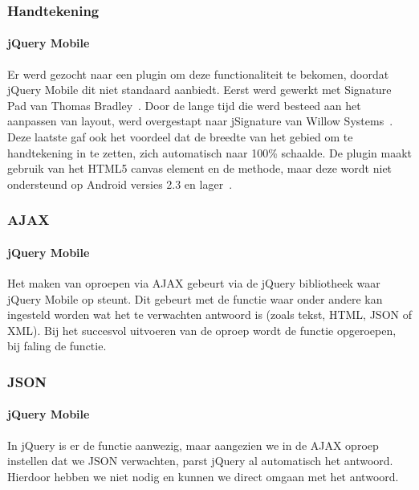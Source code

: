 \subsubsection{Handtekening}

\paragraph{jQuery Mobile} 
Er werd gezocht naar een plugin om deze functionaliteit te bekomen, doordat jQuery Mobile dit niet standaard aanbiedt. Eerst werd gewerkt met Signature Pad van Thomas Bradley~\cite{Bradley2013}. Door de lange tijd die werd besteed aan het aanpassen van layout, werd overgestapt naar jSignature van Willow Systems~\cite{Systems2013}. Deze laatste gaf ook het voordeel dat de breedte van het gebied om te handtekening in te zetten, zich automatisch naar 100\% schaalde. De plugin maakt gebruik van het HTML5 canvas element en de  methode, maar deze wordt niet ondersteund op Android versies 2.3 en lager~\cite{Systems2013}.

\subsubsection{AJAX}

\paragraph{jQuery Mobile} 
Het maken van oproepen via AJAX gebeurt via de jQuery bibliotheek waar jQuery Mobile op steunt. Dit gebeurt met de functie  waar onder andere kan ingesteld worden wat het te verwachten antwoord is (zoals tekst, HTML, JSON of XML). Bij het succesvol uitvoeren van de oproep wordt de  functie opgeroepen, bij faling de  functie.

\subsubsection{JSON}

\paragraph{jQuery Mobile} 
In jQuery is er de functie  aanwezig, maar aangezien we in de AJAX oproep instellen dat we JSON verwachten, parst jQuery al automatisch het antwoord. Hierdoor hebben we  niet nodig en kunnen we direct omgaan met het antwoord.

